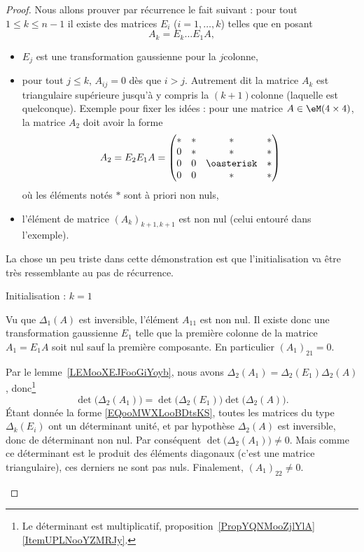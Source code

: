 \begin{proof}
	Nous allons prouver par récurrence le fait suivant : pour tout \( 1\leq k\leq n-1\) il existe des matrices \( E_i\) ($i=1,\ldots, k$) telles que en posant
	\begin{equation}
		A_k=E_{k}\ldots E_1A,
	\end{equation}
	\begin{itemize}
		\item \( E_j\) est une transformation gaussienne pour la \( j\)\ieme colonne,
		\item pour tout \( j\leq k\), \( A_{ij}=0\) dès que \( i>j\). Autrement dit la matrice \( A_k\) est triangulaire supérieure jusqu'à y compris la \( (k+1)\)\ieme colonne (laquelle est quelconque). Exemple pour fixer les idées : pour une matrice \( A\in \eM(4\times 4) \), la matrice \( A_2\) doit avoir la forme
		      \begin{equation}
			      A_2=E_2E_1A=\begin{pmatrix}
				      * & * & *          & * \\
				      0 & * & *          & * \\
				      0 & 0 & \oasterisk & * \\
				      0 & 0 & *          & *
			      \end{pmatrix}
		      \end{equation}
		      où les éléments notés \(*\) sont à priori non nuls,
		\item l'élément de matrice \( (A_k)_{ k+1,k+1  }  \) est non nul (celui entouré dans l'exemple).
	\end{itemize}

	La chose un peu triste dans cette démonstration est que l'initialisation va être très ressemblante au pas de récurrence.
	\begin{subproof}
		\item[Initialisation : \( k=1\)]

		Vu que \( \Delta_1(A)\) est inversible, l'élément \( A_{11}\) est non nul. Il existe donc une transformation gaussienne \( E_1\) telle que la première colonne de la matrice \( A_1=E_1A\) soit nul sauf la première composante. En particulier \( (A_1)_{21}=0\).

		Par le lemme~\ref{LEMooXEJFooGiYoyb}, nous avons \( \Delta_2(A_1)=\Delta_2(E_1)\Delta_2(A)\), donc\footnote{Le déterminant est multiplicatif, proposition~\ref{PropYQNMooZjlYlA}\ref{ItemUPLNooYZMRJy}.}
		\begin{equation}
			\det\big( \Delta_2(A_1) \big)=\det\big( \Delta_2(E_1) \big)\det\big( \Delta_2(A) \big).
		\end{equation}
		Étant donnée la forme \eqref{EQooMWXLooBDtsKS}, toutes les matrices du type \( \Delta_k(E_i)\) ont un déterminant unité, et par hypothèse \( \Delta_2(A)\) est inversible, donc de déterminant non nul. Par conséquent \( \det\big( \Delta_2(A_1) \big)\neq 0\). Mais comme ce déterminant est le produit des éléments diagonaux (c'est une matrice triangulaire), ces derniers ne sont pas nuls. Finalement, \( (A_1)_22\neq 0\).


\end{subproof}
\end{proof}
